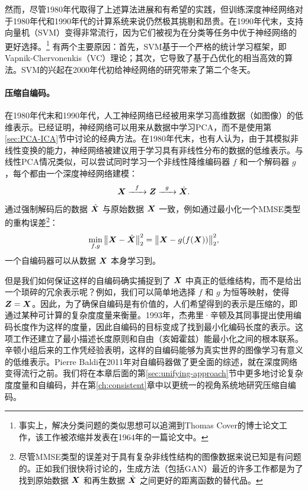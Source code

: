 \documentclass[../../book-main.tex]{subfiles}
\begin{document}
然而，尽管1980年代取得了上述算法进展和有希望的实践，但训练深度神经网络对于1980年代和1990年代的计算系统来说仍然极其挑剔和昂贵。在1990年代末，支持向量机（SVM）\cite{SVM-1995}变得非常流行，因为它们被视为在分类等任务中优于神经网络的更好选择。\footnote{事实上，解决分类问题的类似思想可以追溯到Thomas Cover的博士论文工作，该工作被浓缩并发表在1964年的一篇论文中\cite{Cover-1964}。} 有两个主要原因：首先，SVM基于一个严格的统计学习框架，即Vapnik-Chervonenkis（VC）理论；其次，它导致了基于凸优化\cite{BoydVa04}的相当高效的算法。SVM的兴起在2000年代初给神经网络的研究带来了第二个冬天。

\paragraph{压缩自编码。}
在1980年代末和1990年代，人工神经网络已经被用来学习高维数据（如图像）的低维表示。已经证明，神经网络可以用来从数据中学习PCA\cite{Oja1982SimplifiedNM,Baldi89}，而不是使用第\ref{sec:PCA-ICA}节中讨论的经典方法。在1980年代末，也有人认为，由于其模拟非线性变换的能力，神经网络被建议用于学习具有非线性分布的数据的低维表示。与线性PCA情况类似，可以尝试同时学习一个非线性降维编码器 $f$ 和一个解码器 $g$，每个都由一个深度神经网络建模\cite{Rumelhart1986,Kramer1991NonlinearPC}：
\begin{equation}
    \bm{X}   \xrightarrow{\hspace{2mm} f \hspace{2mm}} \bm{Z}  \xrightarrow{\hspace{2mm} g \hspace{2mm}} \hat {\bm{X}}.
       \label{eqn:auto-encoding-deep-networks}
\end{equation}
通过强制解码后的数据 $\hat {\bm{X}}$ 与原始数据 $\bm{X}$ 一致，例如通过最小化一个MMSE类型的重构误差\footnote{尽管MMSE类型的误差对于具有复杂非线性结构的图像数据来说已知是有问题的。正如我们很快将讨论的，生成方法（包括GAN）最近的许多工作都是为了找到原始数据 $\bm{X}$ 和再生数据 $\hat {\bm{X}}$ 之间更好的距离函数的替代品。}：
\begin{equation}
    \min_{f,g} \big\|\bm{X} - \hat {\bm{X}}\big\|_2^2 = \big\|\bm{X} - g(f( \bm{X}))\big\|_2^2,
\end{equation}
一个自编码器可以从数据 $\bm{X}$ 本身学习到。

但是我们如何保证这样的自编码确实捕捉到了 $\bm{X}$ 中真正的低维结构，而不是给出一个琐碎的冗余表示呢？例如，我们可以简单地选择 $f$ 和 $g$ 为恒等映射，使得 $\bm{Z} = \bm{X}$。因此，为了确保自编码是有价值的，人们希望得到的表示是压缩的，即通过某种可计算的复杂度度量来衡量。1993年，杰弗里·辛顿及其同事提出使用编码长度作为这样的度量，因此自编码的目标变成了找到最小化编码长度的表示\cite{Hinton-1993}。这项工作还建立了最小描述长度原则\cite{Rissanen-1978}和自由（亥姆霍兹）能最小化之间的根本联系。辛顿小组后来的工作\cite{Hinton504}凭经验表明，这样的自编码能够为真实世界的图像学习有意义的低维表示。Pierre Baldi在2011年对自编码器做了更全面的综述\cite{Baldi2011}，就在深度网络变得流行之前。我们将在本章后面的第\ref{sec:unifying-approach}节中更多地讨论复杂度度量和自编码，并在第\ref{ch:consistent}章中以更统一的视角系统地研究压缩自编码。
\end{document}
